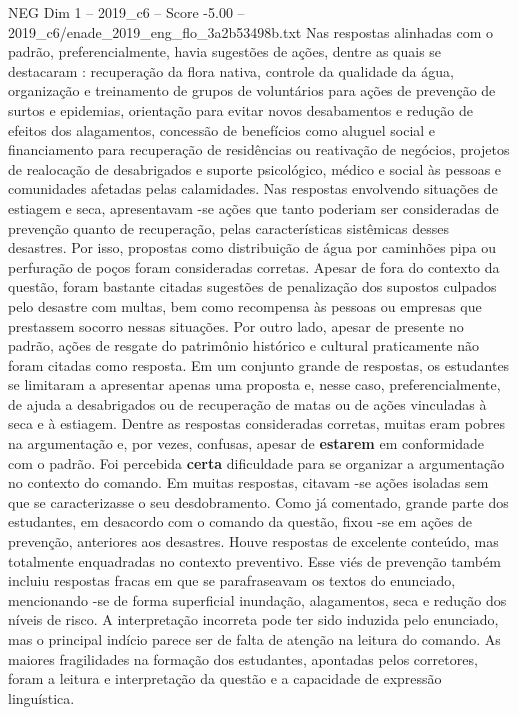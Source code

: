 \begin{textsample}{NEG Dim 1 – 2019\_c6 – Score -5.00 – 2019\_c6/enade\_2019\_eng\_flo\_3a2b53498b.txt}
Nas respostas alinhadas com o padrão, preferencialmente, havia sugestões de ações, dentre as quais se destacaram : recuperação da flora nativa, controle da qualidade da água, organização e treinamento de grupos de voluntários para ações de prevenção de surtos e epidemias, orientação para evitar novos desabamentos e redução de efeitos dos alagamentos, concessão de benefícios como aluguel social e financiamento para recuperação de residências ou reativação de negócios, projetos de realocação de desabrigados e suporte psicológico, médico e social às pessoas e comunidades afetadas pelas calamidades.
Nas respostas envolvendo situações de estiagem e seca, apresentavam -se ações que tanto poderiam ser consideradas de prevenção quanto de recuperação, pelas características sistêmicas desses desastres.
Por isso, propostas como distribuição de água por caminhões pipa ou perfuração de poços foram consideradas corretas.
Apesar de fora do contexto da questão, foram bastante citadas sugestões de penalização dos supostos culpados pelo desastre com multas, bem como recompensa às pessoas ou empresas que prestassem socorro nessas situações.
Por outro lado, apesar de presente no padrão, ações de resgate do patrimônio histórico e cultural praticamente não foram citadas como resposta.
Em um conjunto grande de respostas, os estudantes se limitaram a apresentar apenas uma proposta e, nesse caso, preferencialmente, de ajuda a desabrigados ou de recuperação de matas ou de ações vinculadas à seca e à estiagem.
Dentre as respostas consideradas corretas, muitas eram pobres na argumentação e, por vezes, confusas, apesar de \textbf{estarem} em conformidade com o padrão.
Foi percebida \textbf{certa} dificuldade para se organizar a argumentação no contexto do comando.
Em muitas respostas, citavam -se ações isoladas sem que se caracterizasse o seu desdobramento.
Como já comentado, grande parte dos estudantes, em desacordo com o comando da questão, fixou -se em ações de prevenção, anteriores aos desastres.
Houve respostas de excelente conteúdo, mas totalmente enquadradas no contexto preventivo.
Esse viés de prevenção também incluiu respostas fracas em que se parafraseavam os textos do enunciado, mencionando -se de forma superficial inundação, alagamentos, seca e redução dos níveis de risco.
A interpretação incorreta pode ter sido induzida pelo enunciado, mas o principal indício parece ser de falta de atenção na leitura do comando.
As maiores fragilidades na formação dos estudantes, apontadas pelos corretores, foram a leitura e interpretação da questão e a capacidade de expressão linguística.

\end{textsample}

